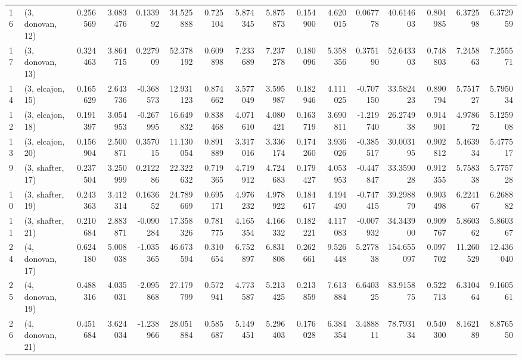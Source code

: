 \begin{tabular}{llrrrrrrrrrrrrrr}
16 &  (3, donovan, 12) &   0.256569 &  3.083476 &  0.133992 &  34.525888 &  0.725104 &   5.874345 &  5.875873 &  0.154900 &  4.620015 &  0.067778 &   40.614603 &  0.804985 &   6.372598 &   6.372959 \\
17 &  (3, donovan, 13) &   0.324463 &  3.864715 &  0.227909 &  52.378192 &  0.609898 &   7.233689 &  7.237278 &  0.180096 &  5.358356 &  0.375190 &   52.643303 &  0.748803 &   7.245863 &   7.255571 \\
14 &  (3, elcajon, 15) &   0.165629 &  2.643736 & -0.368573 &  12.931123 &  0.874662 &   3.577049 &  3.595987 &  0.182946 &  4.111025 & -0.707150 &   33.582423 &  0.890794 &   5.751727 &   5.795034 \\
12 &  (3, elcajon, 18) &   0.191397 &  3.054953 & -0.267995 &  16.649832 &  0.838468 &   4.071610 &  4.080421 &  0.163719 &  3.690811 & -1.219740 &   26.274938 &  0.914901 &   4.978672 &   5.125908 \\
13 &  (3, elcajon, 20) &   0.156904 &  2.500871 &  0.357015 &  11.130054 &  0.891889 &   3.317016 &  3.336174 &  0.174260 &  3.936026 & -0.385517 &   30.003195 &  0.902812 &   5.463934 &   5.477517 \\
9  &  (3, shafter, 17) &   0.237504 &  3.250999 &  0.212286 &  22.322632 &  0.719365 &   4.719912 &  4.724683 &  0.179427 &  4.053953 & -0.447847 &   33.359028 &  0.912355 &   5.758338 &   5.775728 \\
10 &  (3, shafter, 19) &   0.243363 &  3.412314 &  0.163652 &  24.789669 &  0.695171 &   4.976232 &  4.978922 &  0.184617 &  4.194490 & -0.747415 &   39.298879 &  0.903498 &   6.224167 &   6.268882 \\
11 &  (3, shafter, 21) &   0.210684 &  2.883871 & -0.090284 &  17.358326 &  0.781775 &   4.165354 &  4.166332 &  0.182221 &  4.117083 & -0.007932 &   34.343900 &  0.909767 &   5.860362 &   5.860367 \\
24 &  (4, donovan, 17) &   0.624180 &  5.008038 & -1.035365 &  46.673594 &  0.310654 &   6.752897 &  6.831808 &  0.262661 &  9.526448 &  5.277838 &  154.655097 &  0.097702 &  11.260529 &  12.436040 \\
25 &  (4, donovan, 19) &   0.488316 &  4.035031 & -2.095868 &  27.179799 &  0.572941 &   4.773587 &  5.213425 &  0.213859 &  7.613884 &  6.640325 &   83.915875 &  0.522713 &   6.310464 &   9.160561 \\
26 &  (4, donovan, 21) &   0.451684 &  3.624034 & -1.238966 &  28.051884 &  0.585687 &   5.149451 &  5.296403 &  0.176028 &  6.384354 &  3.488811 &   78.793134 &  0.540300 &   8.162189 &   8.876550 \\

\end{tabular}
